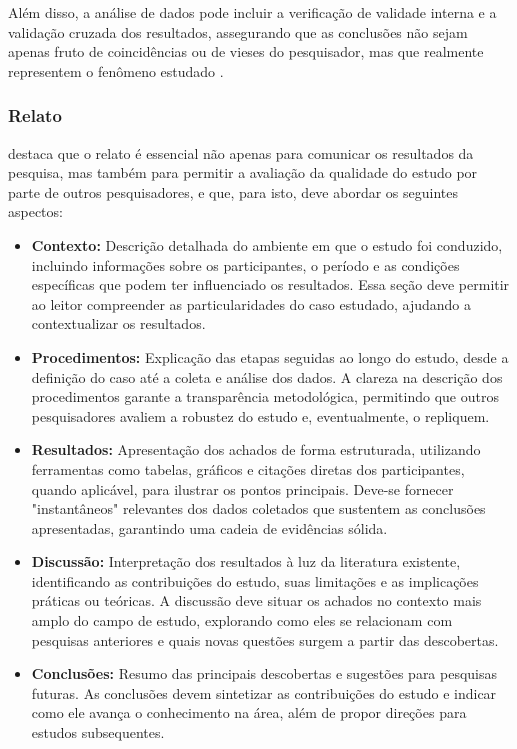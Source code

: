 Além disso, a análise de dados pode incluir a verificação de validade interna e a validação cruzada dos resultados, assegurando que as conclusões não sejam apenas fruto de coincidências ou de vieses do pesquisador, mas que realmente representem o fenômeno estudado \cite{yin_case_study_2009}.

\subsubsection{Relato}

 destaca que o relato é essencial não apenas para comunicar os resultados da pesquisa, mas também para permitir a avaliação da qualidade do estudo por parte de outros pesquisadores, e que, para isto, deve abordar os seguintes aspectos:

\begin{itemize}
\item \textbf{Contexto:} Descrição detalhada do ambiente em que o estudo foi conduzido, incluindo informações sobre os participantes, o período e as condições específicas que podem ter influenciado os resultados. Essa seção deve permitir ao leitor compreender as particularidades do caso estudado, ajudando a contextualizar os resultados.

\item \textbf{Procedimentos:} Explicação das etapas seguidas ao longo do estudo, desde a definição do caso até a coleta e análise dos dados. A clareza na descrição dos procedimentos garante a transparência metodológica, permitindo que outros pesquisadores avaliem a robustez do estudo e, eventualmente, o repliquem.

\item \textbf{Resultados:} Apresentação dos achados de forma estruturada, utilizando ferramentas como tabelas, gráficos e citações diretas dos participantes, quando aplicável, para ilustrar os pontos principais. Deve-se fornecer "instantâneos" relevantes dos dados coletados que sustentem as conclusões apresentadas, garantindo uma cadeia de evidências sólida.

\item \textbf{Discussão:} Interpretação dos resultados à luz da literatura existente, identificando as contribuições do estudo, suas limitações e as implicações práticas ou teóricas. A discussão deve situar os achados no contexto mais amplo do campo de estudo, explorando como eles se relacionam com pesquisas anteriores e quais novas questões surgem a partir das descobertas.

\item \textbf{Conclusões:} Resumo das principais descobertas e sugestões para pesquisas futuras. As conclusões devem sintetizar as contribuições do estudo e indicar como ele avança o conhecimento na área, além de propor direções para estudos subsequentes.
\end{itemize}
